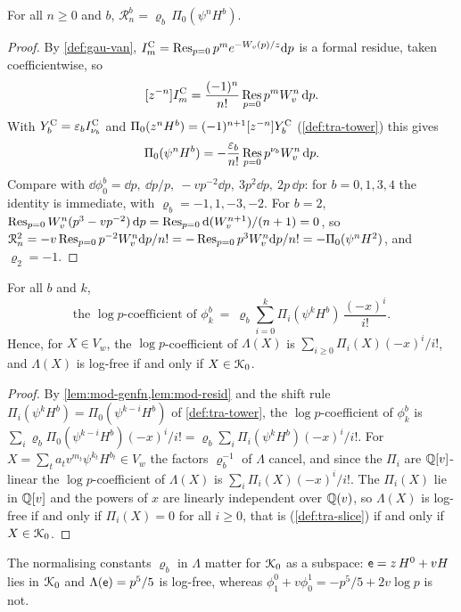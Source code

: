 \begin{lem}
\label{lem:mod-resid}
For all $n\geq 0$ and $b$, $\mathcal R^b_n=\varrho_b\,\Pi_0(\psi^nH^b)$.
\end{lem}

\begin{proof}
By \cref{def:gau-van}, $I^{\mathrm{C}}_m=\operatorname*{Res}_{p=0}p^me^{-W_{v}(p)/z}\mathrm{d} p$ is a formal residue, taken coefficientwise, so
\[
[z^{-n}]I^{\mathrm{C}}_m=\frac{(-1)^n}{n!}\operatorname*{Res}_{p=0}p^mW_{v}^n\,\mathrm{d} p .
\]
With $Y^{\mathrm{C}}_b=\varepsilon_bI^{\mathrm{C}}_{\nu_b}$ and $\Pi_0(z^nH^b)=(-1)^{n+1}[z^{-n}]Y^{\mathrm{C}}_b$ (\cref{def:tra-tower}) this gives
\[
\Pi_0(\psi^nH^b)=-\frac{\varepsilon_b}{n!}\operatorname*{Res}_{p=0}p^{\nu_b}W_{v}^n\,\mathrm{d} p .
\]
Compare with $\dd\phi^b_0=\dd p,\ \dd p/p,\ -vp^{-2}\dd p,\ 3p^2\dd p,\ 2p\,\dd p$: for $b=0,1,3,4$ the identity is immediate, with $\varrho_b=-1,1,-3,-2$. For $b=2$, $\operatorname*{Res}_{p=0}W_{v}^n(p^3-vp^{-2})\,\mathrm{d} p=\operatorname*{Res}_{p=0}\mathrm{d}(W_{v}^{n+1})/(n+1)=0$, so $\mathcal R^2_n=-v\operatorname*{Res}_{p=0}p^{-2}W_{v}^n\mathrm{d} p/n!=-\operatorname*{Res}_{p=0}p^3W_{v}^n\mathrm{d} p/n!=-\Pi_0(\psi^nH^2)$, and $\varrho_2=-1$.
\end{proof}

\begin{prop}
\label{prop:mod-dii}
For all $b$ and $k$,
\begin{equation}
\label{eq:mod-dii}
\text{the }\log p\text{-coefficient of }\phi^b_k\ =\ \varrho_b\sum_{i=0}^k\Pi_i(\psi^kH^b)\,\frac{(-x)^i}{i!}.
\end{equation}
Hence, for $X\in V_w$, the $\log p$-coefficient of $\Lambda(X)$ is $\sum_{i\geq 0}\Pi_i(X)(-x)^i/i!$, and $\Lambda(X)$ is log-free if and only if $X\in\mathcal{K}_{0}$.
\end{prop}

\begin{proof}
By \cref{lem:mod-genfn,lem:mod-resid} and the shift rule $\Pi_i(\psi^kH^b)=\Pi_0(\psi^{k-i}H^b)$ of \cref{def:tra-tower}, the $\log p$-coefficient of $\phi^b_k$ is $\sum_i\varrho_b\Pi_0(\psi^{k-i}H^b)(-x)^i/i!=\varrho_b\sum_i\Pi_i(\psi^kH^b)(-x)^i/i!$. For $X=\sum_ta_tv^{m_t}\psi^{k_t}H^{b_t}\in V_w$ the factors $\varrho_b^{-1}$ of $\Lambda$ cancel, and since the $\Pi_i$ are $\mathbb{Q}[v]$-linear the $\log p$-coefficient of $\Lambda(X)$ is $\sum_i\Pi_i(X)(-x)^i/i!$. The $\Pi_i(X)$ lie in $\mathbb{Q}[v]$ and the powers of $x$ are linearly independent over $\mathbb{Q}(v)$, so $\Lambda(X)$ is log-free if and only if $\Pi_i(X)=0$ for all $i\geq 0$, that is (\cref{def:tra-slice}) if and only if $X\in\mathcal{K}_{0}$.
\end{proof}

The normalising constants $\varrho_b$ in $\Lambda$ matter for $\mathcal{K}_{0}$ as a subspace: $\mathsf{e}=z\,H^0+vH$ lies in $\mathcal{K}_{0}$ and $\Lambda(\mathsf{e})=p^5/5$ is log-free, whereas $\phi^0_1+v\phi^1_0=-p^5/5+2v\log p$ is not.



